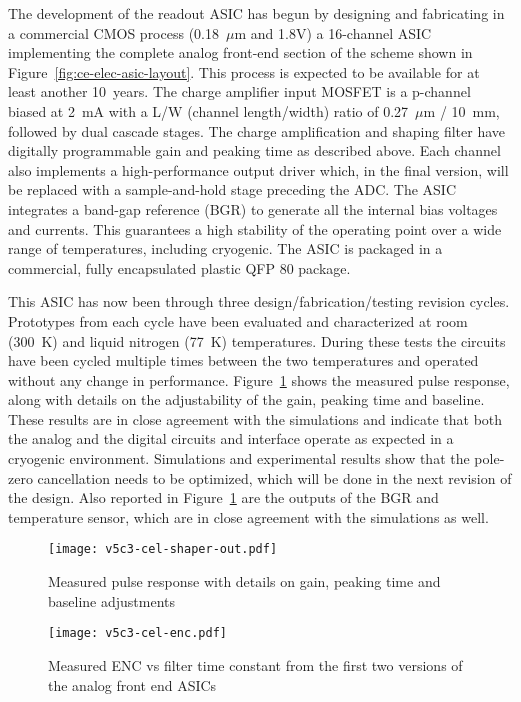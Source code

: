 The development of the readout ASIC has begun by designing and fabricating in a commercial CMOS
process (0.18~$\mu$m and 1.8V) a 16-channel
ASIC implementing the complete analog front-end section of the scheme shown in Figure~\ref{fig:ce-elec-asic-layout}. 
This process is expected to be available for at least another 10~years. 
The charge
amplifier input MOSFET is a p-channel biased at 2~mA with a L/W (channel length/width) ratio
of 0.27~$\mu$m / 10~mm, followed by dual
cascade stages. The charge amplification and shaping filter have
digitally programmable gain and peaking time as described above. Each
channel also implements a high-performance output driver which, in the
final version, will be replaced with a sample-and-hold stage preceding
the ADC. The ASIC integrates a band-gap reference (BGR)  to
generate all the internal bias voltages and currents. This guarantees a
high stability of the operating point over a wide range of
temperatures, including cryogenic. The ASIC is packaged in a
commercial, fully encapsulated plastic QFP 80 package.

This ASIC has now been through three design/fabrication/testing revision cycles. Prototypes from each cycle have been evaluated and characterized at room (300~K) and liquid nitrogen
(77~K) temperatures. During these tests the circuits have been cycled multiple times
between the two temperatures and operated without any change in
performance. Figure~\ref{fig:ce-elec-shaper-out} shows the measured pulse response, along with
details on the adjustability of the gain, peaking time and baseline.
These results are in close agreement with the simulations and indicate
that both the analog and the digital circuits and interface operate as
expected in a cryogenic environment. Simulations and experimental results
show that the pole-zero cancellation needs to be optimized, which will
be done in the next revision of the design. Also reported in Figure~\ref{fig:ce-elec-shaper-out}  are
the outputs of the BGR and temperature sensor, which are in close
agreement with the simulations as well.

\begin{figure}[htbp]
\centering
\texttt{[image: v5c3-cel-shaper-out.pdf]}
\caption[Measured pulse response with details]{Measured pulse response with details on gain, peaking time and baseline adjustments}
\label{fig:ce-elec-shaper-out}
\end{figure}


\begin{figure}[htbp]
\centering
\texttt{[image: v5c3-cel-enc.pdf]}
\caption[Measured ENC vs filter time constant]{Measured ENC vs filter time constant from the first two versions of the analog front end ASICs}
\label{fig:ce-elec-enc}
\end{figure}


